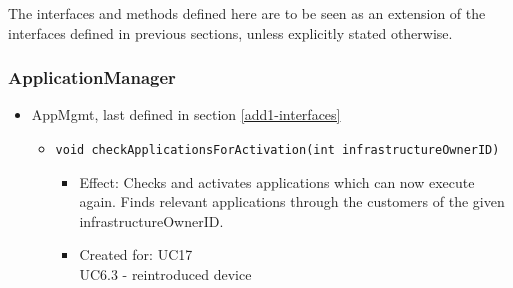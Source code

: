     The interfaces and methods defined here are to be seen as an
    extension of the interfaces defined in previous sections, unless
    explicitly stated otherwise.

    \subsubsection{ApplicationManager}
        \begin{itemize}
            \item AppMgmt, last defined in section \ref{add1-interfaces}
                \begin{itemize}
                    \item \texttt{void checkApplicationsForActivation(int infrastructureOwnerID)}
                        \begin{itemize}
                			\item Effect: Checks and activates applications which can now execute again. Finds relevant applications through the customers of the given infrastructureOwnerID.
                			\item Created for: UC17 \\ UC6.3 - reintroduced device
                        \end{itemize}
                \end{itemize}
        \end{itemize}

